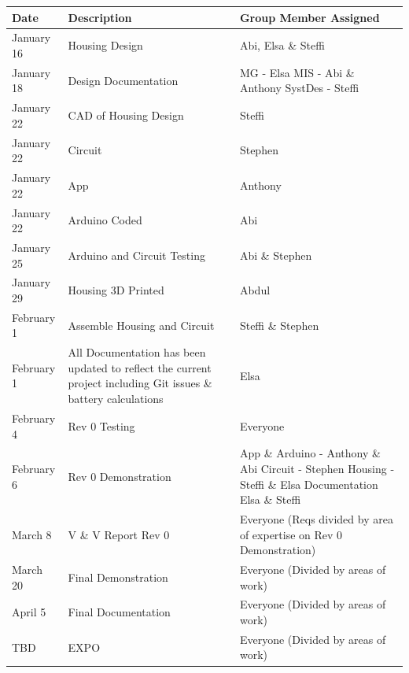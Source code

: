\documentclass[12pt, titlepage]{article}
\begin{document}
\begin{minipage}{\textwidth}
\renewcommand*{\arraystretch}{1.5}
\begin{tabular}{| p{} | p{} | p{} |}
 \hline
 Date & Description & Group Member Assigned\\ 
 \hline
 January 16 & Housing Design & Abi, Elsa \& Steffi\\ 
 \hline
 January 18 & Design Documentation & MG - Elsa \newline MIS - Abi \& Anthony \newline SystDes - Steffi\\ 
  \hline
  January 22 & CAD of Housing Design & Steffi\\ 
  \hline
    January 22 & Circuit & Stephen\\ 
  \hline
    January 22 & App & Anthony\\ 
    \hline
    January 22 & Arduino Coded & Abi\\ 
  \hline
   January 25 & Arduino and Circuit Testing & Abi \& Stephen\\ 
  \hline
   January 29 & Housing 3D Printed & Abdul\\ 
  \hline
    February 1& Assemble Housing and Circuit & Steffi \& Stephen\\ 
  \hline
   February 1& All Documentation has been updated to reflect the current project including Git issues \& battery calculations& Elsa\\ 
  \hline
      February 4 & Rev 0 Testing & Everyone\\ 
  \hline
  February 6 & Rev 0 Demonstration & App \& Arduino - Anthony \& Abi \newline Circuit - Stephen \newline Housing - Steffi \& Elsa \newline Documentation Elsa \& Steffi\\
  \hline
  March 8 & V \& V Report Rev 0 & Everyone \newline(Reqs divided by area of expertise on Rev 0 Demonstration)\\
  \hline
 March 20 & Final Demonstration & Everyone \newline(Divided by areas of work)\\
 \hline
 April 5 & Final Documentation & Everyone \newline(Divided by areas of work)\\
 \hline
 TBD & EXPO & Everyone (Divided by areas of work)\\
 \hline
\end{tabular}
\end{minipage}\\
\end{document}
